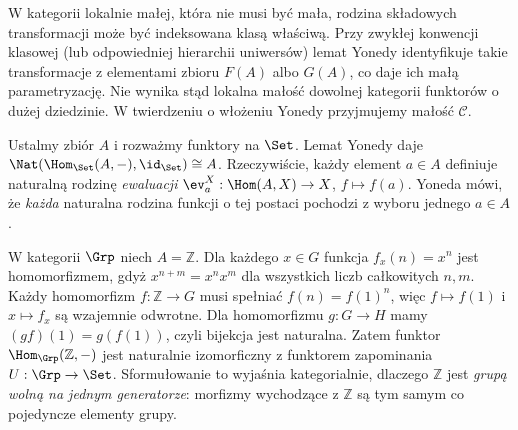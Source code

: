 \begin{uwaga}
W kategorii lokalnie małej, która nie musi być mała, rodzina składowych transformacji może być indeksowana klasą właściwą. Przy zwykłej konwencji klasowej (lub odpowiedniej hierarchii uniwersów) lemat Yonedy identyfikuje takie transformacje z elementami zbioru $F(A)$ albo $G(A)$, co daje ich małą parametryzację. Nie wynika stąd lokalna małość dowolnej kategorii funktorów o dużej dziedzinie. W twierdzeniu o włożeniu Yonedy przyjmujemy małość $\mathcal C$.
\end{uwaga}


\begin{przyklad}
Ustalmy zbiór $A$ i rozważmy funktory na $\Set$. Lemat Yonedy daje $\Nat(\Hom_{\Set}(A,-),\id_{\Set})\cong A$. Rzeczywiście, każdy element $a\in A$ definiuje naturalną rodzinę \emph{ewaluacji} $\ev_a^X:\Hom(A,X)\to X$, $f\mapsto f(a)$. Yoneda mówi, że \emph{każda} naturalna rodzina funkcji o tej postaci pochodzi z wyboru jednego $a\in A$.
\end{przyklad}

\begin{przyklad}
W kategorii $\Grp$ niech $A=\mathbb Z$. Dla każdego $x\in G$ funkcja $f_x(n)=x^n$ jest homomorfizmem, gdyż $x^{n+m}=x^nx^m$ dla wszystkich liczb całkowitych $n,m$. Każdy homomorfizm $f:\mathbb Z\to G$ musi spełniać $f(n)=f(1)^n$, więc $f\mapsto f(1)$ i $x\mapsto f_x$ są wzajemnie odwrotne. Dla homomorfizmu $g:G\to H$ mamy $(gf)(1)=g(f(1))$, czyli bijekcja jest naturalna. Zatem funktor $\Hom_{\Grp}(\mathbb Z,-)$ jest naturalnie izomorficzny z funktorem zapominania $U:\Grp\to\Set$. Sformułowanie to wyjaśnia kategorialnie, dlaczego $\mathbb Z$ jest \emph{grupą wolną na jednym generatorze}: morfizmy wychodzące z $\mathbb Z$ są tym samym co pojedyncze elementy grupy.
\end{przyklad}


